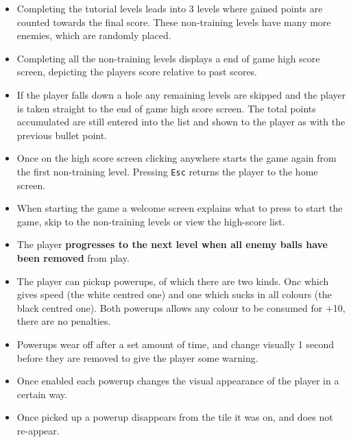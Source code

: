 \begin{itemize}
	\item Completing the tutorial levels leads into 3 levels where gained points are counted towards the final score. These non-training levels have many more enemies, which are randomly placed.
	\item Completing all the non-training levels displays a end of game high score screen, depicting the players score relative to past scores.
	\item If the player falls down a hole any remaining levels are skipped and the player is taken straight to the end of game high score screen. The total points accumulated are still entered into the list and shown to the player as with the previous bullet point.
	\item Once on the high score screen clicking anywhere starts the game again from the first non-training level. Pressing \verb!Esc! returns the player to the home screen.
	\item When starting the game a welcome screen explains what to press to start the game, skip to the non-training levels or view the high-score list.
	\item The player {\bf progresses to the next level when all enemy balls have been removed} from play.
	\item The player can pickup powerups, of which there are two kinds. Onc which gives speed (the white centred one) and one which sucks in all colours (the black centred one). Both powerups allows any colour to be consumed for +10, there are no penalties.
	\item Powerups wear off after a set amount of time, and change visually 1 second before they are removed to give the player some warning.
	\item Once enabled each powerup changes the visual appearance of the player in a certain way.
	\item Once picked up a powerup disappears from the tile it was on, and does not re-appear.
\end{itemize}